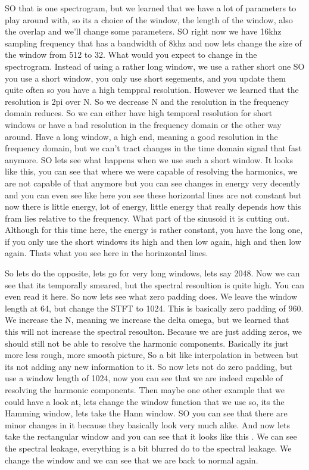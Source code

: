 SO that is one spectrogram, but we learned that we have a lot of parameters to play around with, so its a choice of the window, the length of the window, also the overlap and we'll change some parameters. SO right now we have 16khz sampling frequency that has a bandwidth of 8khz and now lets change the size of the window from 512 to 32. What would you expect to change in the spectrogram.  Instead of using a rather long window, we use a rather short one SO you use a short window, you only use short segements, and you update them quite often so you have a high temppral resolution. However we learned that the resolution is 2pi over N. So we decrease N and the resolution in the frequency domain reduces. So we can either have high temporal resolution for short windows or have a bad resolution in the frequency domain or the other way around.  Have a long window, a high end, meaning a good resolution in the frequency domain, but we can't tract changes in the time domain signal that fast anymore. SO lets see what happens when we use such a short window.  It looks like this, you can see that where we were capable of resolving the harmonics, we are not capable of that anymore but you can see changes in energy very decently and you can even see like here you see these horizontal lines are not constant but now there is little energy, lot of energy, little energy that really depends how this fram lies relative to the frequency. What part of the sinusoid it is cutting out.  Although for this time here, the energy is rather constant, you have the long one, if you only use the short windows its high and then low again, high and then low again. Thats what you see here in the horinzontal lines.

So lets do the opposite, lets go for very long windows, lets say 2048.  Now we can see that its temporally smeared, but the spectral resoultion is quite high. You can even read it here.  So now lets see what zero padding does.  We leave the window length at 64, but change the STFT to 1024.  This is basically zero padding of 960.  We increase the N, meaning we increase the delta omega, but we learned that this will not increase the spectral resoulton.  Because we are just adding zeros, we should still not be able to resolve the harmonic components. Basically its just more less rough, more smooth picture, So a bit like interpolation in between but its not adding any new information to it. So now lets not do zero padding, but use a window length of 1024, now you can see that we are indeed capable of resolving the harmonic components. Then maybe one other example that we could have a look at, lets change the window function that we use so, its the Hamming window, lets take the Hann window.  SO you can see that there are minor changes in it because they basically look very much alike.  And now lets take the rectangular window and you can see that it looks like this . We can see the spectral leakage, everything is a bit blurred do to the spectral leakage. We change the window and we can see that we are back to normal again.

